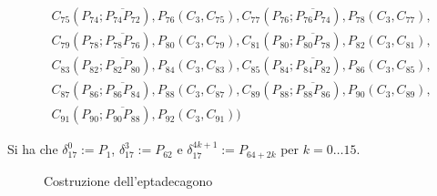 \begin{align*}
&C_{75}(P_{74};\overline{P_{74} P_{72}}), P_{76}(C_{3}, C_{75}), C_{77}(P_{76};\overline{P_{76} P_{74}}), P_{78}(C_{3}, C_{77}),\\
&C_{79}(P_{78};\overline{P_{78} P_{76}}), P_{80}(C_{3}, C_{79}), C_{81}(P_{80};\overline{P_{80} P_{78}}), P_{82}(C_{3}, C_{81}),\\
&C_{83}(P_{82};\overline{P_{82} P_{80}}), P_{84}(C_{3}, C_{83}), C_{85}(P_{84};\overline{P_{84} P_{82}}), P_{86}(C_{3}, C_{85}),\\
&C_{87}(P_{86};\overline{P_{86} P_{84}}), P_{88}(C_{3}, C_{87}), C_{89}(P_{88};\overline{P_{88} P_{86}}), P_{90}(C_{3}, C_{89}),\\
&C_{91}(P_{90};\overline{P_{90} P_{88}}), P_{92}(C_{3}, C_{91}) ) 
\end{align*}

\noindent
Si ha che $\delta_{17}^{0} := P_{1}$, $\delta_{17}^{3} := P_{62}$ e $\delta_{17}^{4k+1} := P_{64 + 2k}$ per $k = 0 \dots 15$.

\begin{figure}[!h]
\begin{center}
\caption{Costruzione dell'eptadecagono}
\end{center}
\end{figure}



%









